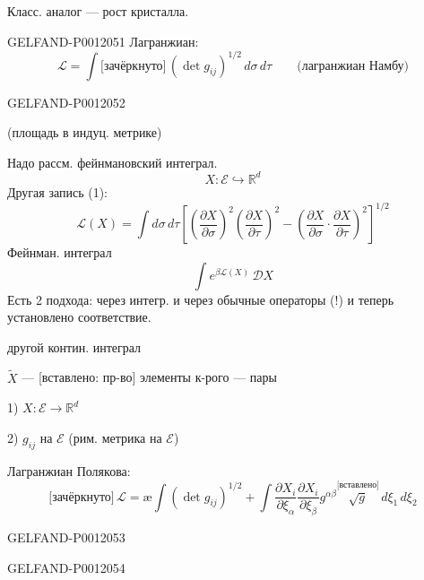 Класс. аналог --- рост кристалла.


\begin{GelfandAdjacentEvidence}{GELFAND-P001205}{1}
Лагранжиан:
\begin{equation*}
\mathcal L=\int\text{[зачёркнуто]}\,
(\det g_{ij})^{1/2}\,d\sigma\,d\tau
\qquad \text{(лагранжиан Намбу)} \tag{1}
\end{equation*}
\end{GelfandAdjacentEvidence}
\begin{GelfandAdjacentEvidence}{GELFAND-P001205}{2}

(площадь в индуц. метрике)

Надо рассм. фейнмановский интеграл.
\[
X:\mathcal E\hookrightarrow\mathbb R^d
\]
Другая запись (1):
\begin{equation*}
\mathcal L(X)=\int d\sigma\,d\tau
\left[
\left(\frac{\partial X}{\partial\sigma}\right)^2
\left(\frac{\partial X}{\partial\tau}\right)^2
-\left(\frac{\partial X}{\partial\sigma}\cdot
\frac{\partial X}{\partial\tau}\right)^2
\right]^{1/2} \tag{1'}
\end{equation*}
Фейнман. интеграл
\begin{equation*}
\int e^{\beta\mathcal L(X)}\,\mathcal D X \tag{2}
\end{equation*}
Есть 2 подхода: через интегр. и через обычные операторы (!) и теперь установлено соответствие.

 другой контин. интеграл

\(\widetilde X\) --- [вставлено: пр-во] элементы к-рого --- пары

1) \(X:\mathcal E\longrightarrow\mathbb R^d\)

2) \(g_{ij}\) на \(\mathcal E\) (рим. метрика на \(\mathcal E\))

Лагранжиан Полякова:
\begin{equation*}
\text{[зачёркнуто]}\,
\mathcal L=\text{\ae}\int(\det g_{ij})^{1/2}
+\int\frac{\partial X_i}{\partial\xi_\alpha}
\frac{\partial X_i}{\partial\xi_\beta}g^{\alpha\beta}
\overset{\text{[вставлено]}}{\sqrt g}\,d\xi_1\,d\xi_2
\tag{3}
\end{equation*}
\end{GelfandAdjacentEvidence}
\begin{GelfandAdjacentEvidence}{GELFAND-P001205}{3}

\end{GelfandAdjacentEvidence}
\begin{GelfandAdjacentEvidence}{GELFAND-P001205}{4}

\end{GelfandAdjacentEvidence}


